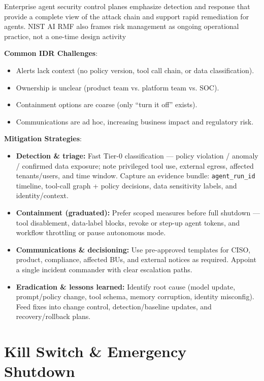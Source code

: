 \begin{TNtwocol}
    Enterprise agent security control planes emphasize detection and response that provide a complete view of the attack chain and support rapid remediation for agents.  NIST AI RMF also frames risk management as ongoing operational practice, not a one-time design activity

    \textbf{Common IDR Challenges}:
    \begin{itemize}
        \item Alerts lack context (no policy version, tool call chain, or data classification).
        \item Ownership is unclear (product team vs. platform team vs. SOC).
        \item Containment options are coarse (only “turn it off” exists).
        \item Communications are ad hoc, increasing business impact and regulatory risk.
    \end{itemize}

    \textbf{Mitigation Strategies}:
    \begin{itemize}
        \item \textbf{Detection \& triage:} Fast Tier-0 classification — policy violation / anomaly / confirmed data exposure; note privileged tool use, external egress, affected tenants/users, and time window. Capture an evidence bundle: \texttt{agent\_run\_id} timeline, tool-call graph + policy decisions, data sensitivity labels, and identity/context.
        \item \textbf{Containment (graduated):} Prefer scoped measures before full shutdown — tool disablement, data-label blocks, revoke or step-up agent tokens, and workflow throttling or pause autonomous mode.
        \item \textbf{Communications \& decisioning:} Use pre-approved templates for CISO, product, compliance, affected BUs, and external notices as required. Appoint a single incident commander with clear escalation paths.
        \item \textbf{Eradication \& lessons learned:} Identify root cause (model update, prompt/policy change, tool schema, memory corruption, identity misconfig). Feed fixes into change control, detection/baseline updates, and recovery/rollback plans.
    \end{itemize}

    \section{Kill Switch & Emergency Shutdown}


\end{TNtwocol}
